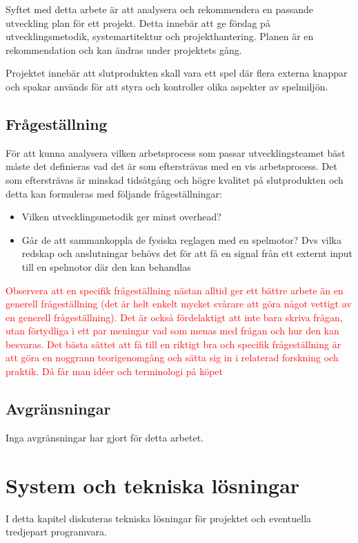 \documentclass[a4paper,12pt,oneside,final]{extbook}
\begin{document}
Syftet med detta arbete är att analysera och rekommendera en passande utveckling plan för ett projekt. Detta innebär att ge förslag på utvecklingsmetodik, systemartitektur och projekthantering. Planen är en rekommendation och kan ändras under projektets gång.

Projektet innebär att slutprodukten skall vara ett spel där flera externa knappar och spakar används för att styra och kontroller olika aspekter av spelmiljön.  


\section{Frågeställning}
För att kunna analysera vilken arbetsprocess som passar utvecklingsteamet bäst måste det definieras vad det är som eftersträvas med en vis arbetsprocess. Det som eftersträvas är minskad tidsåtgång och högre kvalitet på slutprodukten och detta kan formuleras med följande frågeställningar: 
\begin{itemize}
	\item Vilken utvecklingsmetodik ger minst overhead?
	\item  Går de att sammankoppla de fysiska reglagen med en spelmotor? Dvs vilka redskap och anslutningar behövs det för att få en signal från ett externt input till en spelmotor där den kan behandlas

\end{itemize}

\textcolor{red}{Observera att en specifik frågeställning nästan alltid ger ett bättre arbete än en generell frågeställning
(det är helt enkelt mycket svårare att göra något vettigt av en generell frågeställning). Det är också
fördelaktigt att inte bara skriva frågan, utan förtydliga i ett par meningar vad som menas med frågan
och hur den kan besvaras.
Det bästa sättet att få till en riktigt bra och specifik frågeställning är att göra en noggrann teorigenomgång
och sätta sig in i relaterad forskning och praktik. Då får man idéer och terminologi på köpet}





\section{Avgränsningar}
Inga avgränsningar har gjort för detta arbetet.


\chapter{System och tekniska lösningar}
I detta kapitel diskuteras tekniska lösningar för projektet och eventuella tredjepart programvara.
\end{document}
